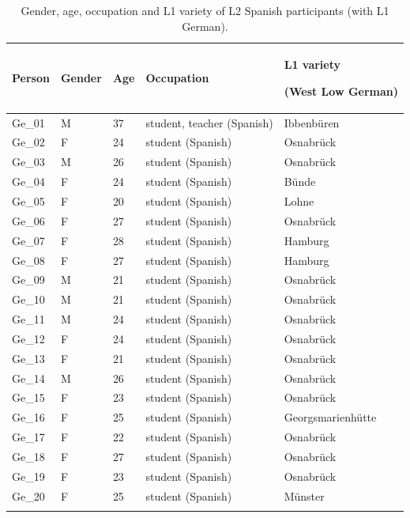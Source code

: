 \begin{table}[p]
\begin{tabularx}{\textwidth}{lllQ>{\raggedright\arraybackslash}p{3.2cm}}

\lsptoprule

{Person} & {Gender} & {Age} & {Occupation} & {L1 variety}

{(West Low German)}\\
\midrule
Ge\_01 & M & 37 & student, teacher (Spanish) & Ibbenbüren\\
Ge\_02 & F & 24 & student (Spanish) & Osnabrück\\
Ge\_03 & M & 26 & student (Spanish) & Osnabrück\\
Ge\_04 & F & 24 & student (Spanish) & Bünde\\
Ge\_05 & F & 20 & student (Spanish) & Lohne\\
Ge\_06 & F & 27 & student (Spanish) & Osnabrück\\
Ge\_07 & F & 28 & student (Spanish) & Hamburg\\
Ge\_08 & F & 27 & student (Spanish) & Hamburg\\
Ge\_09 & M & 21 & student (Spanish) & Osnabrück\\
Ge\_10 & M & 21 & student (Spanish) & Osnabrück\\
Ge\_11 & M & 24 & student (Spanish) & Osnabrück\\
Ge\_12 & F & 24 & student (Spanish) & Osnabrück\\
Ge\_13 & F & 21 & student (Spanish) & Osnabrück\\
Ge\_14 & M & 26 & student (Spanish) & Osnabrück\\
Ge\_15 & F & 23 & student (Spanish) & Osnabrück\\
Ge\_16 & F & 25 & student (Spanish) & Georgsmarienhütte\\
Ge\_17 & F & 22 & student (Spanish) & Osnabrück\\
Ge\_18 & F & 27 & student (Spanish) & Osnabrück\\
Ge\_19 & F & 23 & student (Spanish) & Osnabrück\\
Ge\_20 & F & 25 & student (Spanish) & Münster\\
\lspbottomrule
\end{tabularx}

\caption{\label{tab:3.4}Gender, age, occupation and L1 variety of L2 Spanish participants (with L1 German).}
\end{table}

